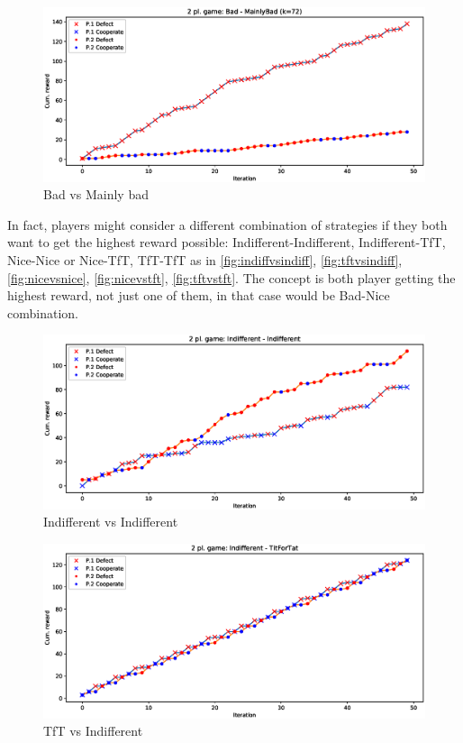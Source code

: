 \documentclass[journal,a4paper,10pt,twoside,draft=false]{IEEEtran}
\begin{document}
\begin{figure}[ht]
    \centering
    \includegraphics[width=1\columnwidth]{../img/ipd2p/ipd2p-rewards-Bad-MainlyBad(k=72)}
    \caption{Bad vs Mainly bad}
    \label{fig:badvsmainlybad}
\end{figure}

In fact, players might consider a different combination of strategies if they both want to get the highest reward possible: Indifferent-Indifferent, Indifferent-TfT, Nice-Nice or Nice-TfT, TfT-TfT as in \autoref{fig:indiffvsindiff}, \autoref{fig:tftvsindiff}, \autoref{fig:nicevsnice}, \autoref{fig:nicevstft}, \autoref{fig:tftvstft}. The concept is both player getting the highest reward, not just one of them, in that case would be Bad-Nice combination.

\begin{figure}[ht]
    \centering
    \includegraphics[width=1\columnwidth]{../img/ipd2p/ipd2p-rewards-Indifferent-Indifferent}
    \caption{Indifferent vs Indifferent}
    \label{fig:indiffvsindiff}
\end{figure}

\begin{figure}[ht]
    \centering
    \includegraphics[width=1\columnwidth]{../img/ipd2p/ipd2p-rewards-Indifferent-TitForTat}
    \caption{TfT vs Indifferent}
    \label{fig:tftvsindiff}
\end{figure}
\end{document}
